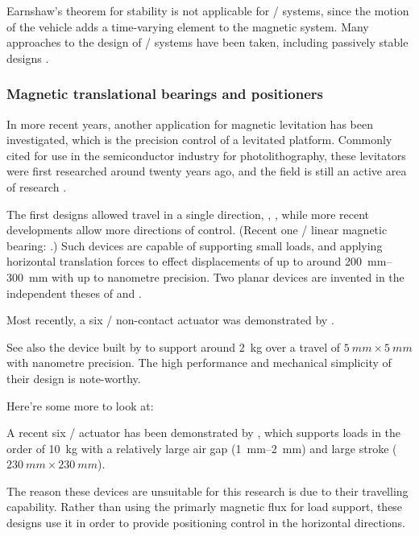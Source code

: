 Earnshaw's theorem for stability is not applicable for \maglev/ systems, since the motion of the vehicle adds a time-varying element to the magnetic system.
Many approaches to the design of \maglev/ systems have been taken, including passively stable designs \cite{musolino2009}.


\subsubsection{Magnetic translational bearings and positioners}

In more recent years, another application for magnetic levitation has been investigated, which is the precision control of a levitated platform.
Commonly cited for use in the semiconductor industry for photolithography, these levitators were first researched around twenty years ago, and the field is still an active area of research \cite{fulford2008,fulford2009}.


The first designs allowed travel in a single direction, \eg, \textcite{trumper1992}, while more recent developments allow more directions of control.
(Recent one \dof/ linear magnetic bearing: \cite{ro2009-preeng}.)
Such devices are capable of supporting small loads, and applying horizontal translation forces to effect displacements of up to around \SI{200}{mm}--\SI{300}{mm} with up to nanometre precision.
Two planar devices are invented in the independent theses of \textcite{kim1997} and \textcite{molenaar2000}.

Most recently, a six \dof/ non-contact actuator was demonstrated by \textcite{verma2004}.

See also the device built by \textcite{kim2007} to support around \SI{2}{kg} over a travel of $\SI{5}{mm}\times\SI{5}{mm}$ with nanometre precision.
The high performance and mechanical simplicity of their design is note-worthy.

Here're some more to look at: \textcite{boeij2008,zhang2008a,shameli2008}

A recent six \dof/ actuator has been demonstrated by \textcite{jansen2008}, which supports loads in the order of \SI{10}{kg} with a relatively large air gap (\SI{1}{mm}--\SI{2}{mm}) and large stroke ($\SI{230}{mm}\times\SI{230}{mm}$).

The reason these devices are unsuitable for this research is due to their travelling capability.
Rather than using the primarly magnetic flux for load support, these designs use it in order to provide positioning control in the horizontal directions.


